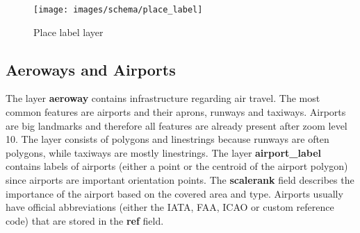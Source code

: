 \begin{figure}[H]
  \centering
  \texttt{[image: images/schema/place\_label]}
  \caption{Place label layer}
\end{figure}

\subsection{Aeroways and Airports}

\noindent\begin{minipage}[t]{0.48\linewidth}
    \vspace{0pt}
    The layer \textbf{aeroway} contains infrastructure regarding air travel. The most common features are airports and their aprons, runways and taxiways. Airports are big landmarks and therefore all features are already present after zoom level 10. The layer consists of polygons and linestrings because runways are often polygons, while taxiways are mostly linestrings.
    The layer \textbf{airport\_label} contains labels of airports (either a point or the centroid of the airport polygon) since airports are important orientation points. The \textbf{scalerank} field describes the importance of the airport based on the covered area and type.
    Airports usually have official abbreviations (either the IATA, FAA, ICAO or custom reference code) that are stored in the \textbf{ref} field.
\end{minipage}
\hfill
